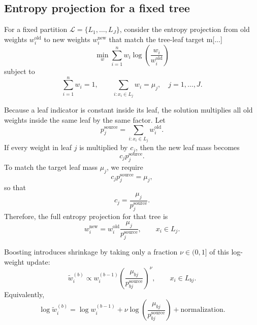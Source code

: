 \documentclass[11pt]{article}
\begin{document}
{\subsection{Entropy projection for a fixed tree}

For a fixed partition $\mathcal{L}=\{L_1,\ldots,L_J\}$, consider the entropy projection from old weights $w_i^{\mathrm{old}}$ to new weights $w_i^{\mathrm{new}}$ that match the tree-leaf target m[...]
\begin{equation*}
\min_w
\sum_{i=1}^n w_i\log\left(\frac{w_i}{w_i^{\mathrm{old}}}\right)
\end{equation*}
subject to
\begin{equation*}
\sum_{i=1}^n w_i=1,
\qquad
\sum_{i:x_i\in L_j}w_i=\mu_j,
\quad j=1,\ldots,J.
\end{equation*}

Because a leaf indicator is constant inside its leaf, the solution multiplies all old weights inside the same leaf by the same factor. Let
\begin{equation*}
p_j^{\mathrm{source}}=\sum_{i:x_i\in L_j}w_i^{\mathrm{old}}.
\end{equation*}
If every weight in leaf $j$ is multiplied by $c_j$, then the new leaf mass becomes
\begin{equation*}
c_jp_j^{\mathrm{source}}.
\end{equation*}
To match the target leaf mass $\mu_j$, we require
\begin{equation*}
c_jp_j^{\mathrm{source}}=\mu_j,
\end{equation*}
so that
\begin{equation*}
c_j=\frac{\mu_j}{p_j^{\mathrm{source}}}.
\end{equation*}
Therefore, the full entropy projection for that tree is
\begin{equation*}
w_i^{\mathrm{new}}
=
w_i^{\mathrm{old}}\frac{\mu_j}{p_j^{\mathrm{source}}},
\qquad x_i\in L_j.
\end{equation*}

Boosting introduces shrinkage by taking only a fraction $\nu\in(0,1]$ of this log-weight update:
\begin{equation*}
\widetilde w_i^{(b)}
\propto
w_i^{(b-1)}
\left(\frac{\mu_{bj}}{p_{bj}^{\mathrm{source}}}\right)^\nu,
\qquad x_i\in L_{bj}.
\end{equation*}
Equivalently,
\begin{equation*}
\log \widetilde w_i^{(b)}
=
\log w_i^{(b-1)}
+
\nu\log\left(\frac{\mu_{bj}}{p_{bj}^{\mathrm{source}}}\right)
+
\mathrm{normalization}.
\end{equation*}

}
\end{document}
